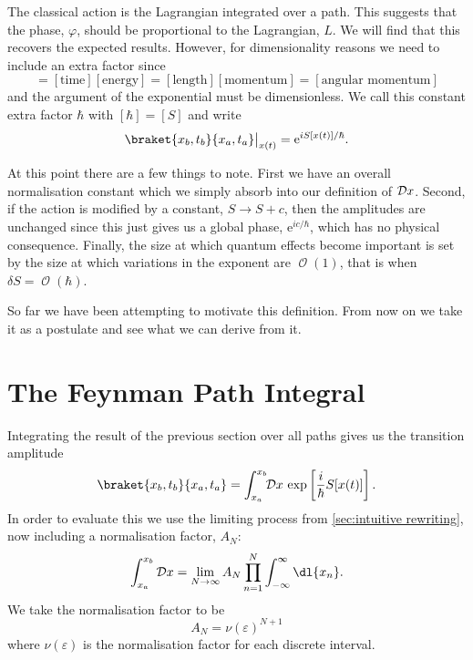 \documentclass[fleqn]{NotesClass}
\newcommand*{\e}{\mathrm{e}}
\newcommand*{\order}{\mathop{\mathcal{O}}}
\newcommand*{\lagrangian}{L}
\begin{document}
    The classical action is the Lagrangian integrated over a path.
    This suggests that the phase, \(\varphi\), should be proportional to the Lagrangian, \(\lagrangian\).
    We will find that this recovers the expected results.
    However, for dimensionality reasons we need to include an extra factor since
    \begin{equation}
        [S] = [\text{time}][\text{energy}] = [\text{length}][\text{momentum}] = [\text{angular momentum}]
    \end{equation}
    and the argument of the exponential must be dimensionless.
    We call this constant extra factor \(\hbar\) with \([\hbar] = [S]\) and write
    \begin{equation}
        \braket{x_b, t_b}{x_a, t_a}\big\vert_{x(t)} = \e^{iS[x(t)]/\hbar}.
    \end{equation}
    
    At this point there are a few things to note.
    First we have an overall normalisation constant which we simply absorb into our definition of \(\DL{x}\).
    Second, if the action is modified by a constant, \(S \to S + c\), then the amplitudes are unchanged since this just gives us a global phase, \(\e^{ic/\hbar}\), which has no physical consequence.
    Finally, the size at which quantum effects become important is set by the size at which variations in the exponent are \(\order(1)\), that is when \(\delta S = \order(\hbar)\).
    
    So far we have been attempting to motivate this definition.
    From now on we take it as a postulate and see what we can derive from it.
    
    \section{The Feynman Path Integral}
    Integrating the result of the previous section over all paths gives us the transition amplitude
    \begin{equation}
        \braket{x_b, t_b}{x_a, t_a} = \int_{x_a}^{x_b} \!\! \DL{x} \, \exp\left[ \frac{i}{\hbar} S[x(t)] \right].
    \end{equation}
    In order to evaluate this we use the limiting process from \cref{sec:intuitive rewriting}, now including a normalisation factor, \(A_N\):
    \begin{equation}
        \int_{x_a}^{x_b}\DL{x} = \lim_{N\to\infty} A_N \prod_{n=1}^{N}\int_{-\infty}^{\infty} \dl{x_n}.
    \end{equation}
    We take the normalisation factor to be
    \begin{equation}
        A_N = \nu(\varepsilon)^{N+1}
    \end{equation}
    where \(\nu(\varepsilon)\) is the normalisation factor for each discrete interval.
    
\end{document}
